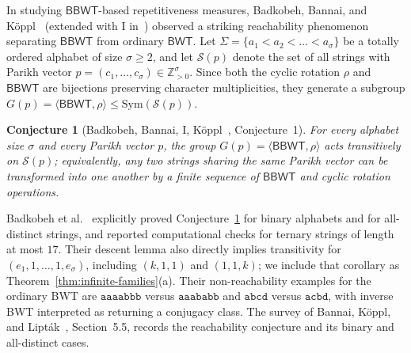 \documentclass[11pt,a4paper]{article}
\newtheorem{conjecture}{Conjecture}
\theoremstyle{definition}
\newcommand{\BBWT}{\mathsf{BBWT}}
\newcommand{\BWT}{\mathsf{BWT}}
\newcommand{\Sym}{\mathrm{Sym}}
\begin{document}
In studying $\BBWT$-based repetitiveness measures, Badkobeh, Bannai, and K\"oppl~\cite{BadkobehBannaiKoppl2024} (extended with I in~\cite{BadkobehBannaiIKoppl2026}) observed a striking reachability phenomenon separating $\BBWT$ from ordinary $\BWT$. Let $\Sigma = \{a_1 < a_2 < \dots < a_\sigma\}$ be a totally ordered alphabet of size $\sigma \ge 2$, and let $\mathcal{S}(p)$ denote the set of all strings with Parikh vector $p = (c_1, \dots, c_\sigma) \in \mathbb{Z}_{>0}^\sigma$. Since both the cyclic rotation $\rho$ and $\BBWT$ are bijections preserving character multiplicities, they generate a subgroup $G(p) = \langle \BBWT, \rho \rangle \le \Sym(\mathcal{S}(p))$.

\begin{conjecture}[Badkobeh, Bannai, I, K\"oppl~\cite{BadkobehBannaiIKoppl2026}, Conjecture~1]
\label{conj:bbwt-reachability}
For every alphabet size $\sigma$ and every Parikh vector $p$, the group $G(p) = \langle \BBWT, \rho \rangle$ acts transitively on $\mathcal{S}(p)$; equivalently, any two strings sharing the same Parikh vector can be transformed into one another by a finite sequence of $\BBWT$ and cyclic rotation operations.
\end{conjecture}

Badkobeh et al.~\cite{BadkobehBannaiIKoppl2026} explicitly proved Conjecture~\ref{conj:bbwt-reachability} for binary alphabets and for all-distinct strings, and reported computational checks for ternary strings of length at most $17$. Their descent lemma also directly implies transitivity for $(e_1,1,\dots,1,e_\sigma)$, including $(k,1,1)$ and $(1,1,k)$; we include that corollary as Theorem~\ref{thm:infinite-families}(a). Their non-reachability examples for the ordinary BWT are $\texttt{aaaabbb}$ versus $\texttt{aaababb}$ and $\texttt{abcd}$ versus $\texttt{acbd}$, with inverse BWT interpreted as returning a conjugacy class. The survey of Bannai, K\"oppl, and Lipt\'ak~\cite{BannaiKopplLiptak2025Survey}, Section~5.5, records the reachability conjecture and its binary and all-distinct cases.
\end{document}
